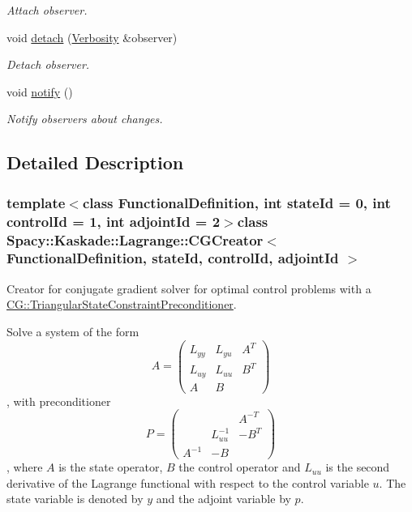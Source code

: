\begin{DoxyCompactItemize}
\begin{DoxyCompactList}\small\item\em \-Attach observer. \end{DoxyCompactList}\item 
\hypertarget{classSpacy_1_1Mixin_1_1MixinConnection_adda739590c487679c26f60e50aedb73f}{void \hyperlink{classSpacy_1_1Mixin_1_1MixinConnection_adda739590c487679c26f60e50aedb73f}{detach} (\hyperlink{classSpacy_1_1Mixin_1_1Verbosity_aefe2f237b0456c4bced001fbfa75f92e}{\-Verbosity} \&observer)}\label{classSpacy_1_1Mixin_1_1MixinConnection_adda739590c487679c26f60e50aedb73f}

\begin{DoxyCompactList}\small\item\em \-Detach observer. \end{DoxyCompactList}\item 
\hypertarget{classSpacy_1_1Mixin_1_1MixinConnection_a1ddeaa78a3bb4a38c2cca36d1f99fe36}{void \hyperlink{classSpacy_1_1Mixin_1_1MixinConnection_a1ddeaa78a3bb4a38c2cca36d1f99fe36}{notify} ()}\label{classSpacy_1_1Mixin_1_1MixinConnection_a1ddeaa78a3bb4a38c2cca36d1f99fe36}

\begin{DoxyCompactList}\small\item\em \-Notify observers about changes. \end{DoxyCompactList}\end{DoxyCompactItemize}


\subsection{\-Detailed \-Description}
\subsubsection*{template$<$class Functional\-Definition, int state\-Id = 0, int control\-Id = 1, int adjoint\-Id = 2$>$class Spacy\-::\-Kaskade\-::\-Lagrange\-::\-C\-G\-Creator$<$ Functional\-Definition, state\-Id, control\-Id, adjoint\-Id $>$}

\-Creator for conjugate gradient solver for optimal control problems with a \hyperlink{classSpacy_1_1CG_1_1TriangularStateConstraintPreconditioner}{\-C\-G\-::\-Triangular\-State\-Constraint\-Preconditioner}. 

\-Solve a system of the form \[ A = \left( \begin{array}{ccc} L_{yy} & L_{yu} & A^T \\ L_{uy} & L_{uu} & B^T \\ A & B & \end{array} \right)\], with preconditioner \[ P = \left( \begin{array}{ccc} & & A^{-T} \\ & L_{uu}^{-1} & -B^T \\ A^{-1} & -B & \end{array} \right)\], where $A$ is the state operator, $B$ the control operator and $L_{uu}$ is the second derivative of the \-Lagrange functional with respect to the control variable $u$. \-The state variable is denoted by $y$ and the adjoint variable by $p$.


